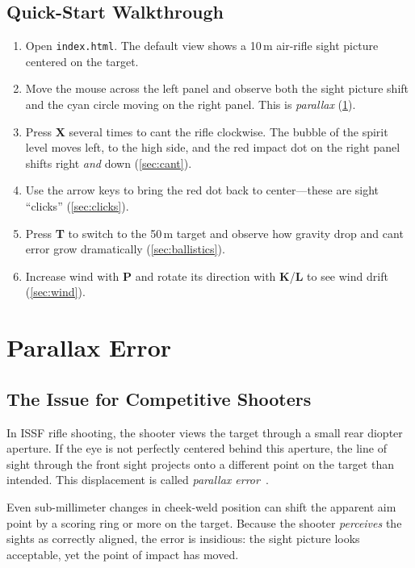 \documentclass[11pt]{article}
\newcommand{\file}[1]{\texttt{#1}}
\newcommand{\key}[1]{\textsf{\textbf{#1}}}
\begin{document}
\subsection{Quick-Start Walkthrough}\label{sec:quickstart}

\begin{enumerate}[nosep]
  \item Open \file{index.html}. The default view shows a 10\,m air-rifle
        sight picture centered on the target.
  \item Move the mouse across the left panel and observe both the sight picture
        shift and the cyan circle moving on the right panel.  This is
        \emph{parallax} (\cref{sec:parallax}).
  \item Press \key{X} several times to cant the rifle clockwise.  The
        bubble of the spirit level moves left, to the high side, and the
        red impact dot on the right panel shifts right \emph{and} down
        (\cref{sec:cant}).
  \item Use the arrow keys to bring the red dot back to center---these
        are sight ``clicks'' (\cref{sec:clicks}).
  \item Press \key{T} to switch to the 50\,m target and observe how
        gravity drop and cant error grow dramatically
        (\cref{sec:ballistics}).
  \item Increase wind with \key{P} and rotate its direction with
        \key{K}/\key{L} to see wind drift (\cref{sec:wind}).
\end{enumerate}


\section{Parallax Error}\label{sec:parallax}

\subsection{The Issue for Competitive Shooters}
In ISSF rifle shooting, the shooter views the target through a
small rear diopter aperture.  If the eye is not perfectly centered
behind this aperture, the line of sight through the front sight
projects onto a different point on the target than intended.  This
displacement is called \emph{parallax error}~\cite{nra,mann}.

Even sub-millimeter changes in cheek-weld position can shift the
apparent aim point by a scoring ring or more on the target.  Because
the shooter \emph{perceives} the sights as correctly aligned, the
error is insidious: the sight picture looks acceptable, yet the
point of impact has moved.
\end{document}

